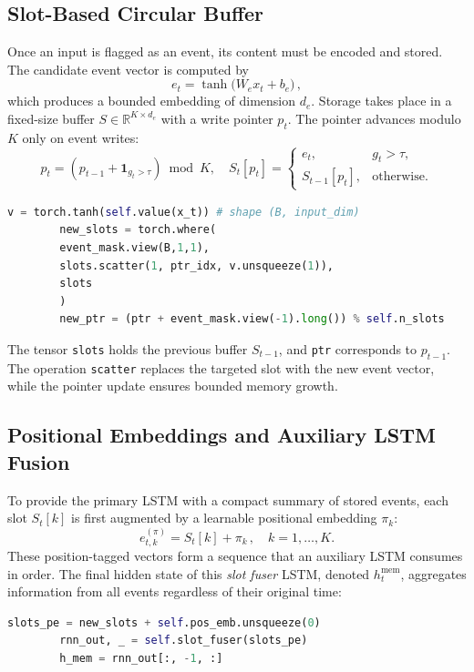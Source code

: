 \documentclass{article}
\begin{document}
	\subsection{Slot-Based Circular Buffer}
	
	Once an input is flagged as an event, its content must be encoded and stored.  The candidate event vector is computed by
	\[
	e_t = \tanh\bigl(W_e x_t + b_e\bigr)\,,
	\]
	which produces a bounded embedding of dimension \(d_e\).  Storage takes place in a fixed-size buffer \(S\in\mathbb{R}^{K\times d_e}\) with a write pointer \(p_t\).  The pointer advances modulo \(K\) only on event writes:
	\[
	p_t = (p_{t-1} + \mathbf{1}_{g_t>\tau}) \bmod K,\quad
	S_t[p_t] = 
	\begin{cases}
		e_t, & g_t > \tau,\\
		S_{t-1}[p_t], & \text{otherwise}.
	\end{cases}
	\]
	
	\begin{lstlisting}[language=Python, caption={Encoding event vector and advancing circular pointer}]
		v = torch.tanh(self.value(x_t)) # shape (B, input_dim)
		new_slots = torch.where(
		event_mask.view(B,1,1),
		slots.scatter(1, ptr_idx, v.unsqueeze(1)),
		slots
		)
		new_ptr = (ptr + event_mask.view(-1).long()) % self.n_slots
	\end{lstlisting}
	
	The tensor \texttt{slots} holds the previous buffer \(S_{t-1}\), and \texttt{ptr} corresponds to \(p_{t-1}\).  The operation \texttt{scatter} replaces the targeted slot with the new event vector, while the pointer update ensures bounded memory growth.
	
	\subsection{Positional Embeddings and Auxiliary LSTM Fusion}
	
	To provide the primary LSTM with a compact summary of stored events, each slot \(S_t[k]\) is first augmented by a learnable positional embedding \(\pi_k\):
	\[
	e^{(\pi)}_{t,k} = S_t[k] + \pi_k\,,\quad k=1,\dots,K.
	\]
	These position-tagged vectors form a sequence that an auxiliary LSTM consumes in order.  The final hidden state of this \emph{slot fuser} LSTM, denoted \(h_t^{\mathrm{mem}}\), aggregates information from all events regardless of their original time:
	
	\begin{lstlisting}[language=Python, caption={Attaching positional embeddings and processing previous hidden state}]
		slots_pe = new_slots + self.pos_emb.unsqueeze(0)
		rnn_out, _ = self.slot_fuser(slots_pe)
		h_mem = rnn_out[:, -1, :]
	\end{lstlisting}
	
\end{document}
